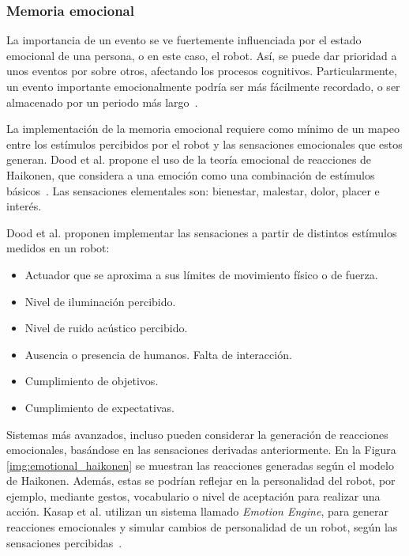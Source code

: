\subsubsection{Memoria emocional}

La importancia de un evento se ve fuertemente influenciada por el estado emocional de una persona, o en este caso, el robot. Así, se puede dar prioridad a unos eventos por sobre otros, afectando los procesos cognitivos. Particularmente, un evento importante emocionalmente podría ser más fácilmente recordado, o ser almacenado por un periodo más largo~\cite{Deutsch2008}.

La implementación de la memoria emocional requiere como mínimo de un mapeo entre los estímulos percibidos por el robot y las sensaciones emocionales que estos generan. Dood et al. propone el uso de la teoría emocional de reacciones de Haikonen, que considera a una emoción como una combinación de estímulos básicos~\cite{Dodd2005}. Las sensaciones elementales son: bienestar, malestar, dolor, placer e interés.

Dood et al. proponen implementar las sensaciones a partir de distintos estímulos medidos en un robot:
\begin{itemize}
	\item Actuador que se aproxima a sus límites de movimiento físico o de fuerza. 
	\item Nivel de iluminación percibido.
	\item Nivel de ruido acústico percibido.
	\item Ausencia o presencia de humanos. Falta de interacción.
	\item Cumplimiento de objetivos.
	\item Cumplimiento de expectativas.
\end{itemize}

Sistemas más avanzados, incluso pueden considerar la generación de reacciones emocionales, basándose en las sensaciones derivadas anteriormente. En la Figura \ref{img:emotional_haikonen} se muestran las reacciones generadas según el modelo de Haikonen. Además, estas se podrían reflejar en la personalidad del robot, por ejemplo, mediante gestos, vocabulario o nivel de aceptación para realizar una acción. Kasap et al. utilizan un sistema llamado \textit{Emotion Engine}, para generar reacciones emocionales y simular cambios de personalidad de un robot, según las sensaciones percibidas~\cite{Kasap2010}.

